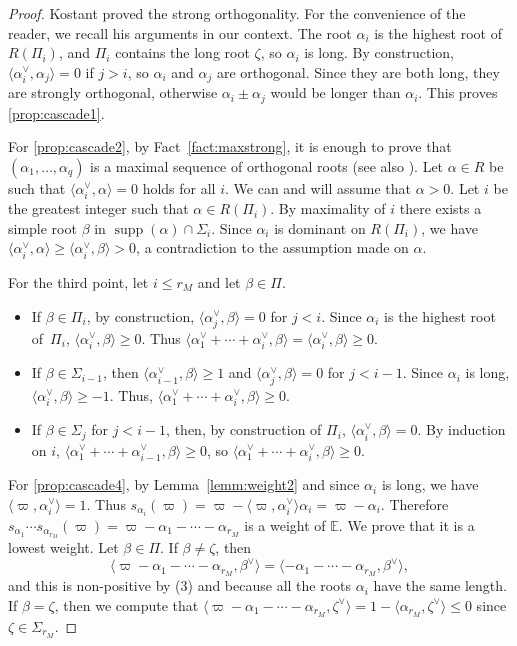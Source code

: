 \documentclass[10pt]{amsart}
\let\oldvee\vee
\renewcommand{\vee}{{\scriptscriptstyle\oldvee}}
\newcommand{\citestar}[3]{\cite[#3]{#1}}
\theoremstyle{plain}
\theoremstyle{definition}
\DeclareMathOperator{\supp}{supp}
\newcommand{\bE}{\mathbb{E}}
\newcommand{\suma}[1]{\alpha_1^\vee + \cdots + \alpha_{#1}^\vee}
\newcommand{\av}{\alpha^\vee}
\newcommand{\rkm}{{r_M}}
\newcommand{\scal}[1]{\langle #1 \rangle}
\begin{document}
\begin{proof}
Kostant \citestar{kostant}*{Lem.\,1.6} proved the strong orthogonality. For the convenience of the reader, we
recall his arguments in our context.
The root $\alpha_i$ is the highest root of $R(\Pi_i)$, and $\Pi_i$ contains the long root $\zeta$,
so $\alpha_i$
is long. By construction, $\scal{\alpha_i^\vee,\alpha_j}=0$ if $j>i$, so $\alpha_i$ and $\alpha_j$ are
orthogonal. Since they are both long, they are strongly orthogonal, otherwise $\alpha_i\pm\alpha_j$ would
be longer than $\alpha_i$. This proves \eqref{prop:cascade1}.

For \eqref{prop:cascade2}, by Fact~\ref{fact:maxstrong}, it is enough to prove that $(\alpha_1,\ldots,\alpha_q)$ is a
maximal sequence of orthogonal roots (see also \citestar{kostant}*{Th.\,1.8}). Let
$\alpha \in R$ be such that $\scal{\alpha_i^\vee,\alpha}=0$ holds for all $i$. We can and will assume that
$\alpha >0$. Let $i$ be the greatest integer such that $\alpha \in R(\Pi_i)$. By maximality of $i$
there exists
a simple root $\beta$ in $\supp(\alpha) \cap \Sigma_i$. Since $\alpha_i$ is dominant on
$R(\Pi_i)$, we have
$\scal{\alpha_i^\vee,\alpha} \geq \scal{\alpha_i^\vee,\beta} > 0$, a contradiction to the assumption made on
$\alpha$.

For the third point, let $i \leq \rkm$ and let $\beta \in \Pi$.
\begin{itemize}
\item If $\beta \in \Pi_i$, by construction, $\scal{\alpha_j^\vee,\beta}=0$ for $j<i$. Since
$\alpha_i$ is the
highest root of~$\Pi_i$, $\scal{\alpha_i^\vee,\beta} \geq 0$. Thus
$\scal{\suma{i},\beta} = \scal{\av_i,\beta} \geq 0$.

\item If $\beta \in \Sigma_{i-1}$, then $\scal{\av_{i-1},\beta} \geq 1$ and $\scal{\av_j,\beta}=0$
for $j<i-1$.
Since $\alpha_i$ is long, $\scal{\av_i,\beta} \geq -1$. Thus, $\scal{\suma{i},\beta} \geq 0$.
\item If $\beta \in \Sigma_j$ for $j<i-1$, then, by construction of $\Pi_i$,
$\scal{\av_i,\beta}=0$. By induction on $i$,
$\scal{\suma{i-1},\beta} \geq 0$, so $\scal{\suma{i},\beta} \geq 0$.
\end{itemize}

For \eqref{prop:cascade4}, by Lemma~\ref{lemm:weight2} and since
$\alpha_i$ is long, we have $\scal{\varpi,\alpha_i^\vee}=1$. Thus $s_{\alpha_i}(\varpi)=\varpi -
\scal{\varpi,\alpha_i^\vee}\alpha_i = \varpi-\alpha_i$.
Therefore
$s_{\alpha_1} \cdots s_{\alpha_\rkm}(\varpi)=\varpi-\alpha_1 - \cdots - \alpha_\rkm$ is a weight of $\bE$.
We prove that it is a lowest weight. Let $\beta \in \Pi$. If $\beta \neq \zeta$, then
$$\scal{\varpi-\alpha_1 - \cdots - \alpha_\rkm,\beta^\vee} = \scal{-\alpha_1 - \cdots -
\alpha_\rkm,\beta^\vee},$$ and
this is non-positive by (3) and because all the roots $\alpha_i$ have the same length. If $\beta=\zeta$, then
we compute that $\scal{\varpi-\alpha_1 - \cdots - \alpha_\rkm,\zeta^\vee} = 1 -
\scal{\alpha_\rkm,\zeta^\vee} \leq 0$
since $\zeta \in \Sigma_\rkm$.
\end{proof}
\end{document}

